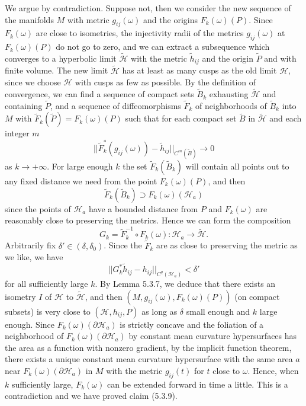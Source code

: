 We argue by contradiction. Suppose not, then we consider the new
sequence of the manifolds $M$ with metric $g_{ij}(\omega)$ and the
origins $F_k(\omega)(P)$. Since $F_k(\omega)$ are close to
isometries, the injectivity radii of the metrics $g_{ij}(\omega)$
at $F_k(\omega)(P)$ do not go to zero, and we can extract a
subsequence which converges to a hyperbolic limit
$\widetilde{\mathcal{H}}$ with the metric $\widetilde{h}_{ij}$ and
the origin $\widetilde{P}$ and with finite volume. The new limit
$\widetilde{\mathcal{H}}$ has at least as many cusps as the old
limit $\mathcal{H}$, since we choose $\mathcal{H}$ with cusps as
few as possible. By the definition of convergence, we can find a
sequence of compact sets $\widetilde{B}_k$ exhausting
$\widetilde{\mathcal{H}}$ and containing $\widetilde{P}$, and a
sequence of diffeomorphisms $\widetilde{F}_k$ of neighborhoods of
$\widetilde{B}_k$ into $M$ with $\widetilde{F}_k(\widetilde{P}) =
F_k(\omega)(P)$ such that for each compact set $\widetilde{B}$ in
$\widetilde{\mathcal{H}}$ and each integer $m$
$$
||\widetilde{F}^*_k(g_{ij}(\omega)) -
\widetilde{h}_{ij}||_{C^m(\widetilde{B})} \rightarrow 0
$$
as $k \rightarrow +\infty$. For large enough $k$ the set
$\widetilde{F}_k(\widetilde{B}_k)$ will contain all points out to
any fixed distance we need from the point $F_k(\omega)(P)$, and
then
$$
\widetilde{F}_k(\widetilde{B}_k)\supset F_k(\omega)(\mathcal{H}_a)
$$
since the points of $\mathcal{H}_a$ have a bounded distance from
$P$ and $F_k(\omega)$ are reasonably close to preserving the
metrics. Hence we can form the composition
$$
G_k=\widetilde{F}^{-1}_k\circ F_k(\omega): \mathcal{H}_a
\rightarrow \widetilde{\mathcal{H}}.
$$
Arbitrarily fix $\delta' \in (\delta, \delta_0)$. Since the
$\widetilde{F}_k$ are as close to preserving the metric as we
like, we have
$$
||G^*_k\widetilde{h}_{ij} - h_{ij}||_{C^q(\mathcal{H}_a)} <
\delta'
$$
for all sufficiently large $k$. By Lemma 5.3.7, we deduce that
there exists an isometry $I$ of $\mathcal{H}$ to
$\widetilde{\mathcal{H}}$, and then
$(M,g_{ij}(\omega),F_k(\omega)(P))$ (on compact subsets) is very
close to $(\mathcal{H},h_{ij},P)$ as long as $\delta$ small enough
and $k$ large enough. Since $F_k(\omega)(\partial \mathcal{H}_a)$
is strictly concave and the foliation of a neighborhood of
$F_k(\omega)(\partial \mathcal{H}_a)$ by constant mean curvature
hypersurfaces has the area as a function with nonzero gradient, by
the implicit function theorem, there exists a unique constant mean
curvature hypersurface with the same area $a$ near
$F_k(\omega)(\partial \mathcal{H}_a)$ in $M$ with the metric
$g_{ij}(t)$ for $t$ close to $\omega$. Hence, when $k$
sufficiently large, $F_k(\omega)$ can be extended forward in time
a little. This is a contradiction and we have proved claim
(5.3.9).

